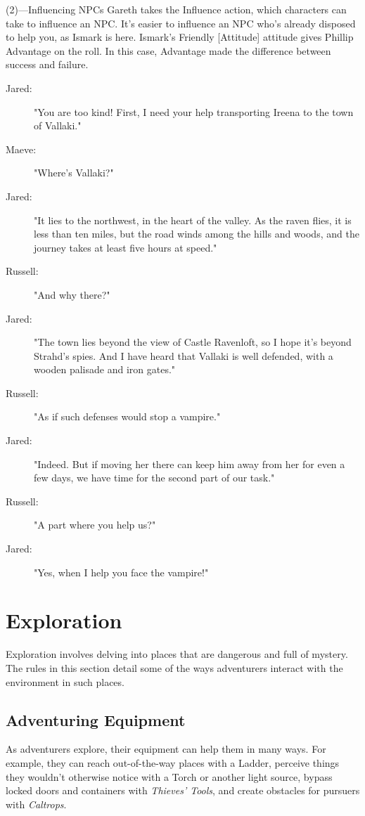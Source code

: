 \documentclass[10pt,a4paper,twoside,bg=print,twocolumn,openany,nodeprecatedcode]{dndbook}
\begin{document}
\begin{DndSidebar}[float=!b]{(2)—Influencing NPCs}
Gareth takes the Influence action, which characters can take to influence an NPC. It's easier to influence an NPC who's already disposed to help you, as Ismark is here. Ismark's Friendly [Attitude] attitude gives Phillip Advantage on the roll. In this case, Advantage made the difference between success and failure.



\end{DndSidebar}


\begin{description}
\item[Jared:]
"You are too kind! First, I need your help transporting Ireena to the town of Vallaki."
\item[Maeve:]
"Where's Vallaki?"
\item[Jared:]
"It lies to the northwest, in the heart of the valley. As the raven flies, it is less than ten miles, but the road winds among the hills and woods, and the journey takes at least five hours at speed."
\item[Russell:]
"And why there?"
\item[Jared:]
"The town lies beyond the view of Castle Ravenloft, so I hope it's beyond Strahd's spies. And I have heard that Vallaki is well defended, with a wooden palisade and iron gates."
\item[Russell:]
"As if such defenses would stop a vampire."
\item[Jared:]
"Indeed. But if moving her there can keep him away from her for even a few days, we have time for the second part of our task."
\item[Russell:]
"A part where you help us?"
\item[Jared:]
"Yes, when I help you face the vampire!"
\end{description}

\section{Exploration}
Exploration involves delving into places that are dangerous and full of mystery. The rules in this section detail some of the ways adventurers interact with the environment in such places.

\subsection{Adventuring Equipment}
As adventurers explore, their equipment can help them in many ways. For example, they can reach out-of-the-way places with a Ladder, perceive things they wouldn't otherwise notice with a Torch or another light source, bypass locked doors and containers with \textit{Thieves' Tools}, and create obstacles for pursuers with \textit{Caltrops}.
\end{document}
